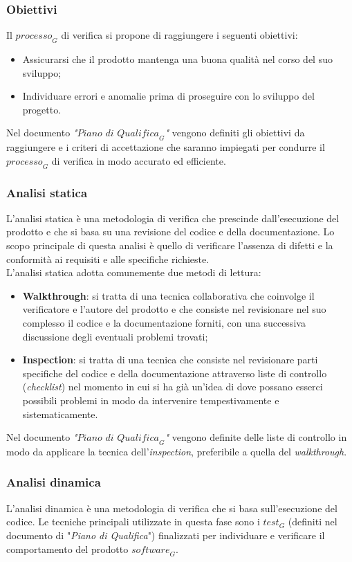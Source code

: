 \subsubsection{Obiettivi}
Il $\textit{processo}_G$ di verifica si propone di raggiungere i seguenti obiettivi:
\begin{itemize}
    \item Assicurarsi che il prodotto mantenga una buona qualità nel corso del suo sviluppo;
    \item Individuare errori e anomalie prima di proseguire con lo sviluppo del progetto.
\end{itemize}
Nel documento \emph{"$\textit{Piano di Qualifica}_G$"} vengono definiti gli obiettivi da raggiungere e i criteri di accettazione  che saranno impiegati per condurre il $\textit{processo}_G$ di verifica in modo accurato ed efficiente. 
\subsubsection{Analisi statica}
L'analisi statica è una metodologia di verifica che prescinde dall'esecuzione del prodotto e che si basa su una revisione del codice e della documentazione. Lo scopo principale di questa analisi è quello di verificare l'assenza di difetti e la conformità ai requisiti e alle specifiche richieste. \\
L'analisi statica adotta comunemente due metodi di lettura:
\begin{itemize}
    \item \textbf{Walkthrough}: si tratta di una tecnica collaborativa che coinvolge il verificatore e l'autore del prodotto e che consiste nel revisionare nel suo complesso il codice e la documentazione forniti, con una successiva discussione degli eventuali problemi trovati;
    \item \textbf{Inspection}: si tratta di una tecnica che consiste nel revisionare parti specifiche del codice e della documentazione attraverso liste di controllo (\emph{checklist}) nel momento in cui si ha già un'idea di dove possano esserci possibili problemi in modo da intervenire tempestivamente e sistematicamente.
\end{itemize}
Nel documento \emph{"$\textit{Piano di Qualifica}_G$"} vengono definite delle liste di controllo in modo da applicare la tecnica dell'\textit{inspection}, preferibile a quella del \textit{walkthrough}.
\subsubsection{Analisi dinamica}
L'analisi dinamica è una metodologia di verifica che si basa sull'esecuzione del codice. Le tecniche principali utilizzate in questa fase sono i $\textit{test}_G$ (definiti nel documento di "\emph{Piano di Qualifica}") finalizzati per individuare e verificare il comportamento del prodotto $\textit{software}_G$.